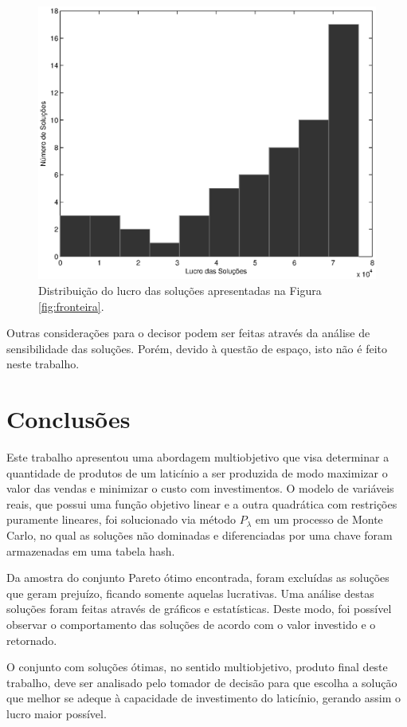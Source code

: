 \documentclass [11pt]{articleSBPO}
\begin{document}
\begin{figure}
	\centering
	\includegraphics[width=12.0cm]{img/hist-lucro}
	\caption{Distribuição do lucro das soluções apresentadas na Figura \ref{fig:fronteira}.}
	\label{fig:hist-lucro}
\end{figure}

Outras considerações para o decisor podem ser feitas através da análise de sensibilidade das soluções. Porém, devido à questão de espaço, isto não é feito neste trabalho.

\section{Conclusões}
\label{sec:conclusao}

Este trabalho apresentou uma abordagem multiobjetivo que visa determinar a quantidade de produtos de um laticínio a ser produzida de modo maximizar o valor das vendas e minimizar o custo com investimentos. O modelo de variáveis reais, que possui uma função objetivo linear e a outra quadrática com restrições puramente lineares, foi solucionado via método $ P_{\lambda} $ em um processo de Monte Carlo, no qual as soluções não dominadas e diferenciadas por uma chave foram armazenadas em uma tabela hash.

Da amostra do conjunto Pareto ótimo encontrada, foram excluídas as soluções que geram prejuízo, ficando somente aquelas lucrativas. Uma análise destas soluções foram feitas através de gráficos e estatísticas. Deste modo, foi possível observar o comportamento das soluções de acordo com o valor investido e o retornado.

O conjunto com soluções ótimas, no sentido multiobjetivo, produto final deste trabalho, deve ser analisado pelo tomador de decisão para que escolha a solução que melhor se adeque à capacidade de investimento do laticínio, gerando assim o lucro maior possível.



\end{document}
